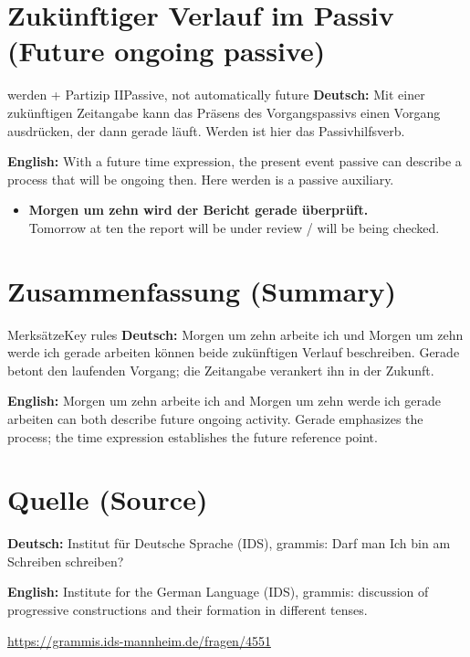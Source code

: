 \documentclass[a4paper,11pt]{article}
\newcommand{\GermanText}[1]{\textbf{Deutsch: }#1\par}
\newcommand{\EnglishText}[1]{{\small\color{SoftGray}\textbf{English: }#1\par}}
\newcommand{\ExampleItem}[2]{\item \textbf{#1}\\{\small\color{SoftGray}#2}}
\begin{document}
\section{Zukünftiger Verlauf im Passiv \textnormal{(Future ongoing passive)}}
\begin{grammarentry}{werden + Partizip II}{Passive, not automatically future}
\GermanText{Mit einer zukünftigen Zeitangabe kann das Präsens des Vorgangspassivs einen Vorgang ausdrücken, der dann gerade läuft. Werden ist hier das Passivhilfsverb.}
\EnglishText{With a future time expression, the present event passive can describe a process that will be ongoing then. Here werden is a passive auxiliary.}
\end{grammarentry}
\begin{exbox}
\begin{itemize}
\ExampleItem{Morgen um zehn wird der Bericht gerade überprüft.}{Tomorrow at ten the report will be under review / will be being checked.}
\end{itemize}
\end{exbox}
\section{Zusammenfassung \textnormal{(Summary)}}
\begin{grammarentry}{Merksätze}{Key rules}
\GermanText{Morgen um zehn arbeite ich und Morgen um zehn werde ich gerade arbeiten können beide zukünftigen Verlauf beschreiben. Gerade betont den laufenden Vorgang; die Zeitangabe verankert ihn in der Zukunft.}
\EnglishText{Morgen um zehn arbeite ich and Morgen um zehn werde ich gerade arbeiten can both describe future ongoing activity. Gerade emphasizes the process; the time expression establishes the future reference point.}
\end{grammarentry}

\section{Quelle \textnormal{(Source)}}
        \GermanText{Institut für Deutsche Sprache (IDS), grammis: Darf man Ich bin am Schreiben schreiben?}
        \EnglishText{Institute for the German Language (IDS), grammis: discussion of progressive constructions and their formation in different tenses.}
        \url{https://grammis.ids-mannheim.de/fragen/4551}
\end{document}
